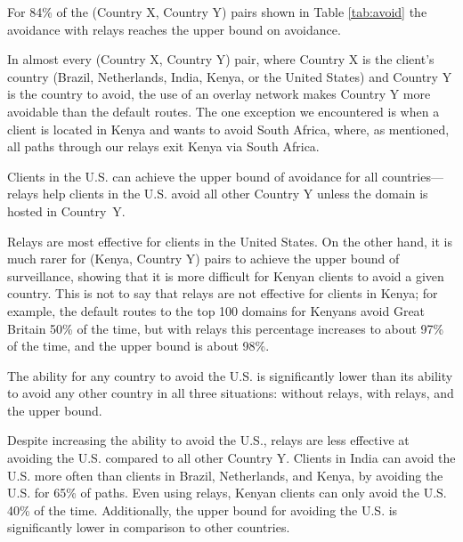 \begin{finding}
For 84\% of the (Country X, Country Y) pairs shown in Table \ref{tab:avoid} the avoidance with relays reaches the upper bound on avoidance. 
\end{finding}
\noindent
In almost every (Country X, Country Y) pair, where Country X is the
client's country (Brazil, Netherlands, India, Kenya, or the United
States) and Country Y is the country to avoid, the use of an overlay
network makes Country Y more avoidable than the default routes.  The one
exception we encountered is when a client is located in Kenya and wants
to avoid South Africa, where, as mentioned, all paths through our
relays exit Kenya via South Africa.

\begin{finding}
Clients in the U.S. can achieve the upper bound of avoidance for all
countries---relays help clients in
the U.S. avoid all other Country Y unless the domain is hosted in Country~Y.  
\end{finding}
\noindent
Relays are most effective for clients in the United States.  On the other hand, it is much rarer for (Kenya, Country Y) pairs to achieve the upper bound of surveillance, showing that it is more difficult for Kenyan clients to avoid a given country.  This is not to say that relays are not effective for clients in Kenya; for example, the default routes to the top 100 domains for Kenyans avoid Great Britain 50\% of the time, but with relays this percentage increases to about 97\% of the time, and the upper bound is about 98\%. 

\begin{finding}
The ability for any country to avoid the U.S. is significantly lower than its ability to avoid any other country in all three situations: without relays, with relays, and the upper bound. 
\end{finding}
\noindent
Despite increasing the ability to avoid the U.S., relays are less
effective at avoiding the U.S. compared to all other Country Y.
Clients in India can avoid the U.S. more often than clients in Brazil,
Netherlands, and Kenya, by avoiding the U.S. for 65\% of paths.  Even
using relays, Kenyan clients can only avoid the U.S. 40\% of the time.  Additionally, the upper bound for avoiding the U.S. is significantly lower in comparison to other countries.  

